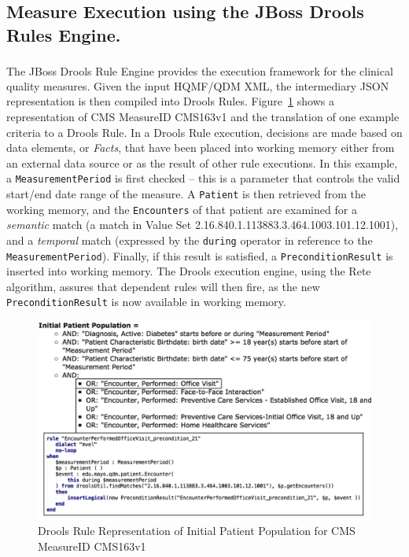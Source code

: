 \documentclass{amia}
\begin{document}
\subsection{Measure Execution using the JBoss{\textsuperscript{\textregistered}} Drools Rules Engine.}
The JBoss{\textsuperscript{\textregistered}} Drools Rule Engine provides the execution framework for the clinical quality measures. Given the input HQMF/QDM XML, the intermediary JSON representation is then compiled into Drools Rules. Figure~\ref{fig:text_to_drools} shows a representation of CMS MeasureID CMS163v1 and the translation of one example criteria to a Drools Rule. In a Drools Rule execution, decisions are made based on data elements, or \textit{Facts}, that have been placed into working memory either from an external data source or as the result of other rule executions. In this example, a \texttt{MeasurementPeriod} is first checked -- this is a parameter that controls the valid start/end date range of the measure. A \texttt{Patient} is then retrieved from the working memory, and the \texttt{Encounters} of that patient are examined for a \textit{semantic} match (a match in Value Set 2.16.840.1.113883.3.464.1003.101.12.1001), and a \textit{temporal} match (expressed by the \texttt{during} operator in reference to the \texttt{MeasurementPeriod}). Finally, if this result is satisfied, a \texttt{PreconditionResult} is inserted into working memory. The Drools execution engine, using the Rete\cite{forgy1982rete} algorithm, assures that dependent rules will then fire, as the new \texttt{PreconditionResult} is now available in working memory.

\begin{figure}%
\includegraphics[width=\linewidth]{drools-amia}
\caption{Drools Rule Representation of Initial Patient Population for CMS MeasureID CMS163v1} 
\label{fig:text_to_drools}
\end{figure}
\end{document}
